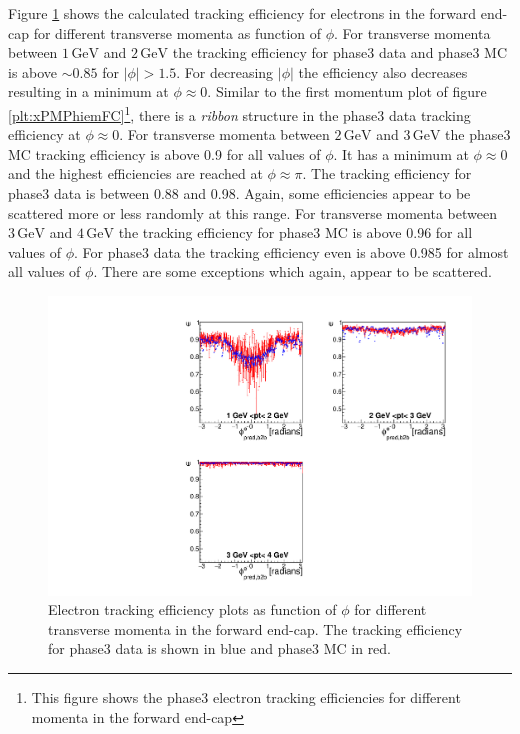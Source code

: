 \documentclass[a4paper,11pt,twosided,final,german,openbib,pdftex,listof=totoc,bibliography=totoc]{scrbook}
\begin{document}
Figure \ref{plt:xPtMPhiemFC3} shows the calculated tracking efficiency for electrons in the forward end-cap for different transverse momenta as function of $\phi$. 
For transverse momenta between $1\,\textrm{GeV}$ and $2\,\textrm{GeV}$ the tracking efficiency for phase3 data and phase3 MC is above $\sim 0.85$ for $|\phi| >1.5$. For decreasing $|\phi|$ the efficiency also decreases resulting in a minimum at $\phi \approx 0$. Similar to the first momentum plot of figure \ref{plt:xPMPhiemFC}\footnote{This figure shows the phase3 electron tracking efficiencies for different momenta in the forward end-cap}, there is a \textit{ribbon} structure in the phase3 data tracking efficiency at $\phi \approx 0$.
For transverse momenta between $2\,\textrm{GeV}$ and $3\,\textrm{GeV}$ the phase3 MC tracking efficiency is above 0.9 for all values of $\phi$. It has a minimum at $\phi \approx 0$ and the highest efficiencies are reached at $\phi \approx \pi$. The tracking efficiency for phase3 data is between 0.88 and 0.98. Again, some efficiencies appear to be scattered more or less randomly at this range. 
For transverse momenta between $3\,\textrm{GeV}$ and $4\,\textrm{GeV}$ the tracking efficiency for phase3 MC is above 0.96 for all values of $\phi$. For phase3 data the tracking efficiency even is above 0.985 for almost all values of $\phi$. There are some exceptions which again, appear to be scattered.


\begin{figure}[!htbp]
	\centering
	\includegraphics[width=\textwidth]{Plots/master3/xPtMPhiemFCP3}
	\caption[Transverse Momentum $\phi$ Electron Forward End-Cap Efficiency Phase3]{Electron tracking efficiency plots as function of $\phi$ for different transverse momenta in the forward end-cap. The tracking efficiency for phase3 data is shown in blue and phase3 MC in red.}
	\label{plt:xPtMPhiemFC3}
\end{figure}
\end{document}
